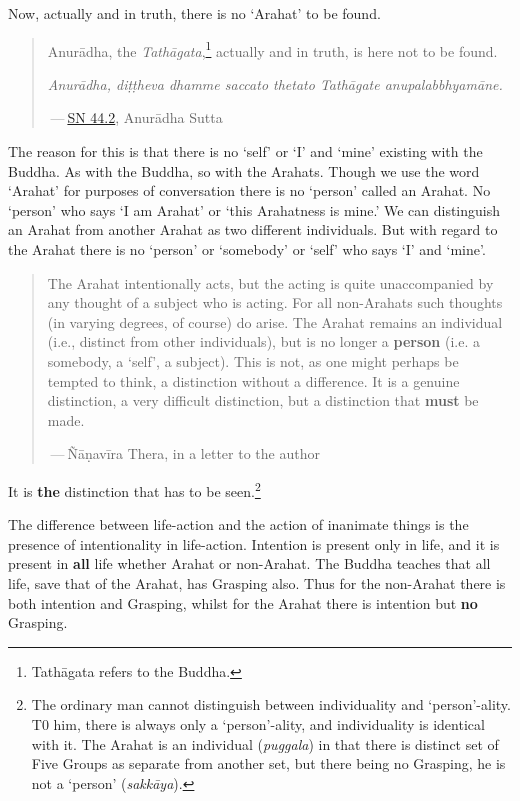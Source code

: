Now, actually and in truth, there is no `Arahat' to be found.

\begin{quote}
Anurādha, the \emph{Tathāgata},\footnote{Tathāgata refers to the Buddha.} actually and in truth, is here not to be found.

\emph{Anurādha, diṭṭheva dhamme saccato thetato Tathāgate anupalabbhyamāne.}

 --- \href{https://suttacentral.net/sn44.2/en/sujato}{SN 44.2}, Anurādha Sutta
\end{quote}

The reason for this is that there is no `self' or `I' and `mine' existing with the Buddha. As with the Buddha, so with the Arahats. Though we use the word `Arahat' for purposes of conversation there is no `person' called an Arahat. No `person' who says `I am Arahat' or `this Arahatness is mine.' We can distinguish an Arahat from another Arahat as two different individuals. But with regard to the Arahat there is no `person' or `somebody' or `self' who says `I' and `mine'.

\begin{quote}
The Arahat intentionally acts, but the acting is quite unaccompanied by any thought of a subject who is acting. For all non-Arahats such thoughts (in varying degrees, of course) do arise. The Arahat remains an individual (i.e., distinct from other individuals), but is no longer a \textbf{person} (i.e. a somebody, a `self', a subject). This is not, as one might perhaps be tempted to think, a distinction without a difference. It is a genuine distinction, a very difficult distinction, but a distinction that \textbf{must} be made.

 --- Ñāṇavīra Thera, in a letter to the author
\end{quote}

It is \textbf{the} distinction that has to be seen.\footnote{The ordinary man cannot distinguish between individuality and `person'-ality. T0 him, there is always only a `person'-ality, and individuality is identical with it. The Arahat is an individual (\emph{puggala}) in that there is distinct set of Five Groups as separate from another set, but there being no Grasping, he is not a `person' (\emph{sakkāya}).}

The difference between life-action and the action of inanimate things is the presence of intentionality in life-action. Intention is present only in life, and it is present in \textbf{all} life whether Arahat or non-Arahat. The Buddha teaches that all life, save that of the Arahat, has Grasping also. Thus for the non-Arahat there is both intention and Grasping, whilst for the Arahat there is intention but \textbf{no} Grasping.

